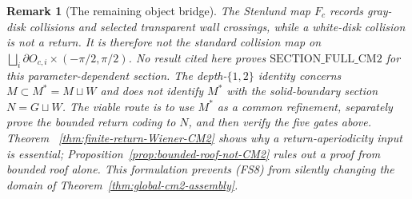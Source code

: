 \documentclass[11pt]{article}
\newtheorem{remark}[theorem]{Remark}
\begin{document}
\begin{remark}[The remaining object bridge]
\label{rem:fixed-section-object-bridge}
The Stenlund map $F_c$ records gray-disk collisions and selected transparent
wall crossings, while a white-disk collision is not a return.  It is therefore
not the standard collision map on
$\bigsqcup_i\partial O_{c,i}\times(-\pi/2,\pi/2)$.  No result cited here proves
$\mathrm{SECTION\_FULL\_CM2}$ for this parameter-dependent section.  The
depth-$\{1,2\}$ identity concerns $M\subset M^*=M\sqcup W$ and does not
identify $M^*$ with the solid-boundary section $N=G\sqcup W$.  The viable
route is to use $M^*$ as a common refinement, separately prove the bounded
return coding to $N$, and then verify the five gates above.  Theorem~
\ref{thm:finite-return-Wiener-CM2} shows why a return-aperiodicity input is
essential; Proposition~\ref{prop:bounded-roof-not-CM2} rules out a proof from
bounded roof alone.  This formulation prevents \textup{(FS8)} from silently
changing the domain of Theorem~\ref{thm:global-cm2-assembly}.
\end{remark}
\end{document}
